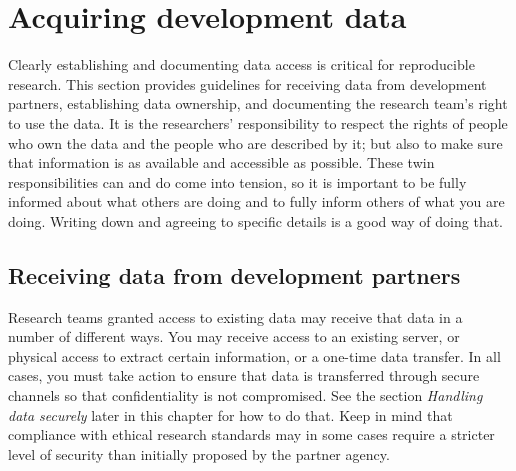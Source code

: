 \section{Acquiring development data}

Clearly establishing and documenting data access is critical for reproducible research.
This section provides guidelines for receiving data from development partners,
establishing data ownership,
and documenting the research team's right to use the data.
It is the researchers' responsibility to respect the rights
of people who own the data and the people who are described by it;
but also to make sure that information is as available and accessible as possible.
These twin responsibilities can and do come into tension,
so it is important to be fully informed about what others are doing
and to fully inform others of what you are doing.
Writing down and agreeing to specific details is a good way of doing that.

\subsection{Receiving data from development partners}

Research teams granted access to existing data may receive that data in a number of different ways.
You may receive access to an existing server,
or physical access to extract certain information,
or a one-time data transfer.
In all cases, you must take action to ensure
that data is transferred through
secure channels so that confidentiality is not compromised.
See the section \textit{Handling data securely} later in this chapter for how to do that.
Keep in mind that compliance with ethical research standards may
in some cases require a stricter level of security than initially proposed by the partner agency.

